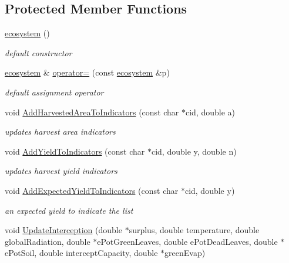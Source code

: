 \subsection*{Protected Member Functions}
\begin{DoxyCompactItemize}
\item 
\hyperlink{classecosystem_aa4a78b7909049a2e4a0208e446e0028c}{ecosystem} ()
\begin{DoxyCompactList}\small\item\em default constructor \item\end{DoxyCompactList}\item 
\hyperlink{classecosystem}{ecosystem} \& \hyperlink{classecosystem_a5970455f5f04fa5382ebc534c3149185}{operator=} (const \hyperlink{classecosystem}{ecosystem} \&p)
\begin{DoxyCompactList}\small\item\em default assignment operator \item\end{DoxyCompactList}\item 
void \hyperlink{classecosystem_abc7a644bdde090e99a70f5a34d6dfe8b}{AddHarvestedAreaToIndicators} (const char $\ast$cid, double a)
\begin{DoxyCompactList}\small\item\em updates harvest area indicators \item\end{DoxyCompactList}\item 
void \hyperlink{classecosystem_a12089f5ede359af7641a52c456d257a6}{AddYieldToIndicators} (const char $\ast$cid, double y, double n)
\begin{DoxyCompactList}\small\item\em updates harvest yield indicators \item\end{DoxyCompactList}\item 
void \hyperlink{classecosystem_ae1107288d1b4c6749be48752cd319487}{AddExpectedYieldToIndicators} (const char $\ast$cid, double y)
\begin{DoxyCompactList}\small\item\em an expected yield to indicate the list \item\end{DoxyCompactList}\item 
void \hyperlink{classecosystem_a326b1b05494d4637c425a256dd6fed4c}{UpdateInterception} (double $\ast$surplus, double temperature, double globalRadiation, double $\ast$ePotGreenLeaves, double ePotDeadLeaves, double $\ast$ePotSoil, double interceptCapacity, double $\ast$greenEvap)

\end{DoxyCompactItemize}
